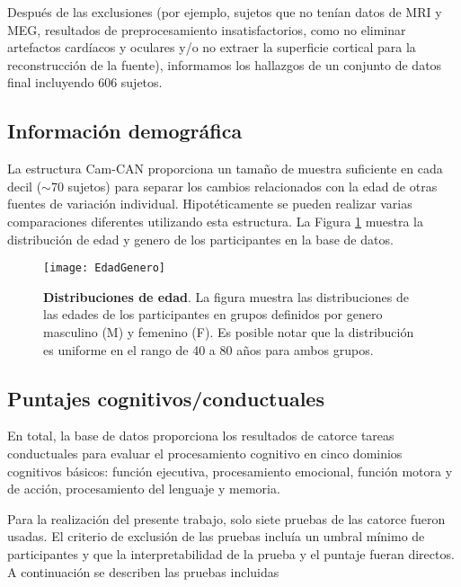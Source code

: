\documentclass[11pt,letterpaper]{article}
\numberwithin{equation}{subsection}
\numberwithin{table}{subsection}
\begin{document}
\bigskip
\noindent Después de las exclusiones (por ejemplo, sujetos que no tenían datos de MRI y MEG, resultados de preprocesamiento insatisfactorios, como no eliminar artefactos cardíacos y oculares y/o no extraer la superficie cortical para la reconstrucción de la fuente), informamos los hallazgos de un conjunto de datos final incluyendo 606 sujetos.

\subsection{Información demográfica}

\smallskip
\noindent La estructura Cam-CAN proporciona un tamaño de muestra suficiente en cada decil ($\sim$70 sujetos) para separar los cambios relacionados con la edad de otras fuentes de variación individual. Hipotéticamente se pueden realizar varias comparaciones diferentes utilizando esta estructura. La Figura \ref{fig:Fig10} muestra la distribución de edad y genero de los participantes en la base de datos.   

\begin{figure}[H]
\centering
	\texttt{[image: EdadGenero]}
	\captionsetup{labelfont=bf}
	\caption{\scriptsize \textbf{Distribuciones de edad}. La figura muestra las distribuciones de las edades de los participantes en grupos definidos por genero masculino (M) y femenino (F). Es posible notar que la distribución es uniforme en el rango de 40 a 80 años para ambos grupos.}
	\label{fig:Fig10}
\end{figure}

\subsection{Puntajes cognitivos/conductuales}

\bigskip
\noindent En total, la base de datos proporciona los resultados de catorce tareas conductuales para evaluar el procesamiento cognitivo en cinco dominios cognitivos básicos: función ejecutiva, procesamiento emocional, función motora y de acción, procesamiento del lenguaje y memoria. %

\bigskip
\noindent Para la realización del presente trabajo, solo siete pruebas de las catorce fueron usadas. El criterio de exclusión de las pruebas incluía un umbral mínimo de participantes y que la interpretabilidad de la prueba y el puntaje fueran directos. A continuación se describen las pruebas incluidas
\end{document}
